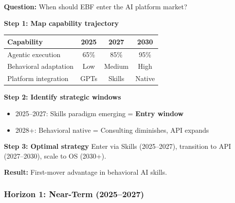 \begin{tcolorbox}[colback=orange!5!white, colframe=orange!75!black,
    title=\textbf{Worked Example: Strategic Window Analysis}]

\textbf{Question:} When should EBF enter the AI platform market?

\textbf{Step 1: Map capability trajectory}
\begin{center}
\begin{tabular}{@{}lccc@{}}
Capability & 2025 & 2027 & 2030 \\
\hline
Agentic execution & 65\% & 85\% & 95\% \\
Behavioral adaptation & Low & Medium & High \\
Platform integration & GPTs & Skills & Native \\
\end{tabular}
\end{center}

\textbf{Step 2: Identify strategic windows}
\begin{itemize}[nosep]
    \item 2025--2027: Skills paradigm emerging = \textbf{Entry window}
    \item 2028+: Behavioral native = Consulting diminishes, API expands
\end{itemize}

\textbf{Step 3: Optimal strategy}
Enter via Skills (2025--2027), transition to API (2027--2030), scale to OS (2030+).

\textbf{Result:} First-mover advantage in behavioral AI skills.

\end{tcolorbox}

\subsubsection{Horizon 1: Near-Term (2025--2027)}

